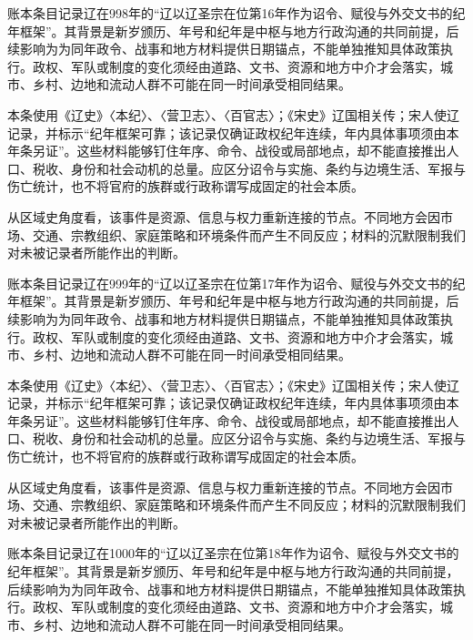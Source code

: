 账本条目记录辽在998年的“辽以辽圣宗在位第16年作为诏令、赋役与外交文书的纪年框架”。其背景是新岁颁历、年号和纪年是中枢与地方行政沟通的共同前提，后续影响为为同年政令、战事和地方材料提供日期锚点，不能单独推知具体政策执行。政权、军队或制度的变化须经由道路、文书、资源和地方中介才会落实，城市、乡村、边地和流动人群不可能在同一时间承受相同结果。

本条使用《辽史》〈本纪〉、〈营卫志〉、〈百官志〉；《宋史》辽国相关传；宋人使辽记录，并标示“纪年框架可靠；该记录仅确证政权纪年连续，年内具体事项须由本年条另证”。这些材料能够钉住年序、命令、战役或局部地点，却不能直接推出人口、税收、身份和社会动机的总量。应区分诏令与实施、条约与边境生活、军报与伤亡统计，也不将官府的族群或行政称谓写成固定的社会本质。

从区域史角度看，该事件是资源、信息与权力重新连接的节点。不同地方会因市场、交通、宗教组织、家庭策略和环境条件而产生不同反应；材料的沉默限制我们对未被记录者所能作出的判断。

账本条目记录辽在999年的“辽以辽圣宗在位第17年作为诏令、赋役与外交文书的纪年框架”。其背景是新岁颁历、年号和纪年是中枢与地方行政沟通的共同前提，后续影响为为同年政令、战事和地方材料提供日期锚点，不能单独推知具体政策执行。政权、军队或制度的变化须经由道路、文书、资源和地方中介才会落实，城市、乡村、边地和流动人群不可能在同一时间承受相同结果。

本条使用《辽史》〈本纪〉、〈营卫志〉、〈百官志〉；《宋史》辽国相关传；宋人使辽记录，并标示“纪年框架可靠；该记录仅确证政权纪年连续，年内具体事项须由本年条另证”。这些材料能够钉住年序、命令、战役或局部地点，却不能直接推出人口、税收、身份和社会动机的总量。应区分诏令与实施、条约与边境生活、军报与伤亡统计，也不将官府的族群或行政称谓写成固定的社会本质。

从区域史角度看，该事件是资源、信息与权力重新连接的节点。不同地方会因市场、交通、宗教组织、家庭策略和环境条件而产生不同反应；材料的沉默限制我们对未被记录者所能作出的判断。

账本条目记录辽在1000年的“辽以辽圣宗在位第18年作为诏令、赋役与外交文书的纪年框架”。其背景是新岁颁历、年号和纪年是中枢与地方行政沟通的共同前提，后续影响为为同年政令、战事和地方材料提供日期锚点，不能单独推知具体政策执行。政权、军队或制度的变化须经由道路、文书、资源和地方中介才会落实，城市、乡村、边地和流动人群不可能在同一时间承受相同结果。

